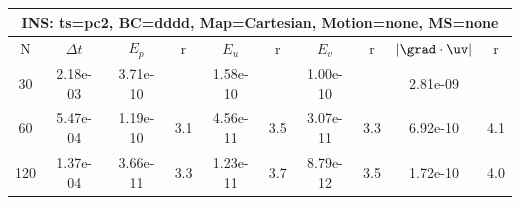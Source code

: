
\begin{tabular}{|c|c|c|c|c|c|c|c|c|c|} \hline
 \multicolumn{10}{|c|}{INS: ts=pc2, BC=dddd, Map=Cartesian, Motion=none, MS=none } \\ \hline 
     N  &   $\Delta t$ & $E_p$   &  r  &   $E_u$   &   r    &   $E_v$   & r   &  $|\grad\cdot\uv|$  & r   \\ \hline 
  30   &  2.18e-03  &   3.71e-10  &        &   1.58e-10  &        &   1.00e-10  &        &   2.81e-09  &        \\ 
  60   &  5.47e-04  &   1.19e-10  & 3.1  &   4.56e-11  & 3.5  &   3.07e-11  & 3.3  &   6.92e-10  & 4.1  \\ 
 120   &  1.37e-04  &   3.66e-11  & 3.3  &   1.23e-11  & 3.7  &   8.79e-12  & 3.5  &   1.72e-10  & 4.0  \\ 
 \hline 
\end{tabular}
